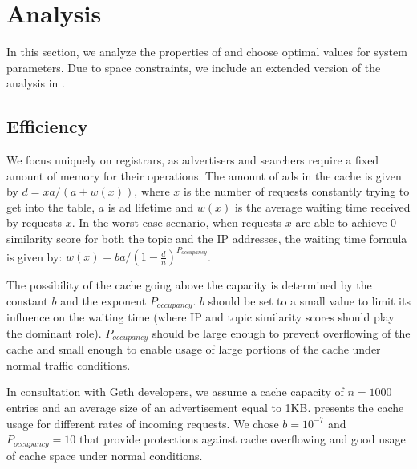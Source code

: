 
\section{Analysis}\label{sec:analysis}
In this section, we analyze the properties of \sysname and choose optimal values for system parameters. Due to space constraints, we include an extended version of the analysis in .
\subsection{Efficiency}

We focus uniquely on registrars, as advertisers and searchers require a fixed amount of memory for their operations. The amount of ads in the cache is given by $d = xa/(a + w(x))$, where $x$ is the number of requests constantly trying to get into the table, $a$ is ad lifetime and $w(x)$ is the average waiting time received by requests $x$.
In the worst case scenario, when requests $x$ are able to achieve 0 similarity score for both the topic and the IP addresses, the waiting time formula is given by: $w(x) = ba/(1 - \frac{d}{n})^{P_\textit{occupancy}}$.

The possibility of the cache going above the capacity is determined by the constant $b$ and the exponent $P_\textit{occupancy}$. $b$ should be set to a small value to limit its influence on the waiting time (where IP and topic similarity scores should play the dominant role). $P_\textit{occupancy}$ should be large enough to prevent overflowing of the cache and small enough to enable usage of large portions of the cache under normal traffic conditions. 

In consultation with Geth developers, we assume a cache capacity of $n = 1000$ entries  and an average size of an advertisement equal to 1KB.  presents the cache usage for different rates of incoming requests. We chose $b=10^{-7}$ and $P_\textit{occupancy}=10$ that provide protections against cache overflowing and good usage of cache space under normal conditions. 

